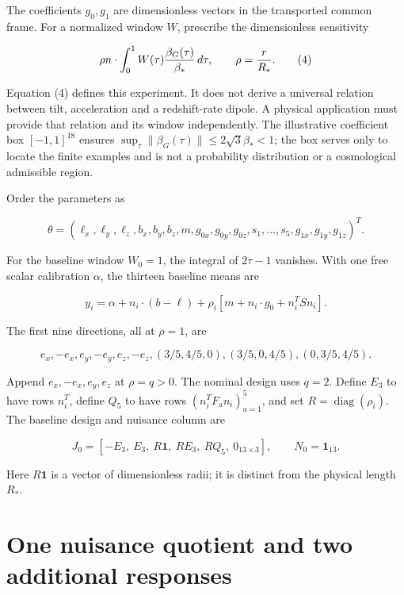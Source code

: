 The coefficients \(g_0,g_1\) are dimensionless vectors in the transported common frame. For a normalized window \(W\), prescribe the dimensionless sensitivity

\[
\rho n\cdot\int_0^1 W(\tau){\beta_G(\tau)\over\beta_*}\,d\tau,
\qquad \rho={r\over R_*}.                               \tag{4}
\]

Equation (4) defines this experiment. It does not derive a universal relation between tilt, acceleration and a redshift-rate dipole. A physical application must provide that relation and its window independently. The illustrative coefficient box \([-1,1]^{18}\) ensures \(\sup_\tau\|\beta_G(\tau)\|\le2\sqrt3\beta_*<1\); the box serves only to locate the finite examples and is not a probability distribution or a cosmological admissible region.

Order the parameters as

\[
\theta=(\ell_x,\ell_y,\ell_z,b_x,b_y,b_z,m,
g_{0x},g_{0y},g_{0z},s_1,\ldots,s_5,g_{1x},g_{1y},g_{1z})^T.
                                                               \tag{5}
\]

For the baseline window \(W_0=1\), the integral of \(2\tau-1\) vanishes. With one free scalar calibration \(\alpha\), the thirteen baseline means are

\[
y_i=\alpha+n_i\cdot(b-\ell)
       +\rho_i[m+n_i\cdot g_0+n_i^TSn_i].                 \tag{6}
\]

The first nine directions, all at \(\rho=1\), are

\[
e_x,-e_x,e_y,-e_y,e_z,-e_z,
(3/5,4/5,0),(3/5,0,4/5),(0,3/5,4/5).                    \tag{7}
\]

Append \(e_x,-e_x,e_y,e_z\) at \(\rho=q>0\). The nominal design uses \(q=2\). Define \(E_3\) to have rows \(n_i^T\), define \(Q_5\) to have rows \((n_i^TF_an_i)_{a=1}^5\), and set \(R=\operatorname{diag}(\rho_i)\). The baseline design and nuisance column are

\[
J_0=[-E_3,\ E_3,\ R\mathbf1,\ RE_3,\ RQ_5,\ 0_{13\times3}],
\qquad N_0=\mathbf1_{13}.                                \tag{8}
\]

Here \(R\mathbf1\) is a vector of dimensionless radii; it is distinct from the physical length \(R_*\).

\hypertarget{one-nuisance-quotient-and-two-additional-responses}{%
\section{One nuisance quotient and two additional responses}\label{one-nuisance-quotient-and-two-additional-responses}}

